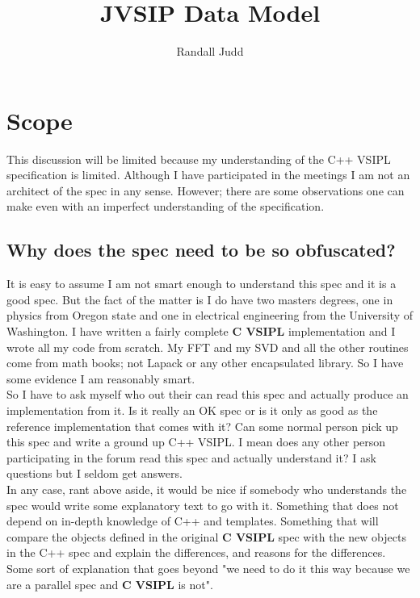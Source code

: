 \documentclass[11pt, oneside]{article}
\title{JVSIP Data Model}
\author{Randall Judd}
\newcommand{\cvl}{\ttbf{C VSIPL}}
\newcommand{\ttbf}[1]{{\ttfamily \bfseries #1}}
\begin{document}
\maketitle
\section{Scope}
This discussion will be limited because my understanding of the C++ VSIPL specification is limited. Although I have participated in the meetings I am not an architect of the spec in any sense.  However; there are some observations one can make even with an imperfect understanding of the specification.
\subsection{Why does the spec need to be so obfuscated?}
It is easy to assume I am not smart enough to understand this spec and it is a good spec.  But the fact of the matter is I do have two masters degrees, one in physics from Oregon state and one in electrical engineering from the University of Washington.  I have written a fairly complete \cvl{} implementation and I wrote all my code from scratch.  My FFT and my SVD and all the other routines come from math books; not Lapack or any other encapsulated library.  So I have some evidence I am reasonably smart.
\\[6pt]
So I have to ask myself who out their can read this spec and actually produce an implementation from it.  Is it really an OK spec or is it only as good as the reference implementation that comes with it?  Can some normal person pick up this spec and write a ground up C++ VSIPL. I mean does any other person participating in the forum read this spec and actually understand it?  I ask questions but I seldom get answers.
\\[6pt]
In any case, rant above aside, it would be nice if somebody who understands the spec would write some explanatory text to go with it.  Something that does not depend on in-depth knowledge of C++ and templates. Something that will compare the objects defined in the original \cvl{} spec with the new objects in the C++ spec and explain the differences, and reasons for the differences. Some sort of explanation that goes beyond "we need to do it this way because we are a parallel spec and \cvl{} is not".
\end{document}
